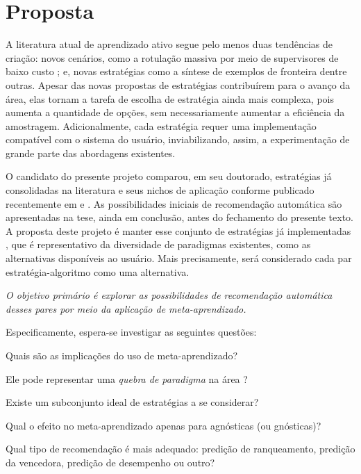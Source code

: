 \section{Proposta}\label{pr}
A literatura atual de aprendizado ativo segue pelo menos duas tendências de criação:
novos cenários, como a rotulação massiva por meio de supervisores de baixo custo \citep{journals/ijcv/VijayanarasimhanG14};
e, novas estratégias como a síntese de exemplos de fronteira \citep{journals/ijon/WangHYL15}
dentre outras.
Apesar das novas propostas de estratégias contribuírem para o avanço da área,
elas tornam a tarefa de escolha de estratégia ainda mais complexa,
pois aumenta a quantidade de opções, sem necessariamente aumentar a eficiência
da amostragem.
Adicionalmente, cada estratégia requer uma implementação compatível com o sistema do usuário,
inviabilizando, assim, a experimentação de grande parte das abordagens existentes.

O candidato do presente projeto comparou, em seu doutorado, estratégias já
consolidadas na literatura e seus nichos de aplicação conforme publicado recentemente
em \cite{santos2014viabilidade} e \cite{conf/hais/SantosC14}.
As possibilidades iniciais de recomendação automática são apresentadas na tese,
ainda em conclusão, antes do fechamento do presente texto.
A proposta deste projeto é manter esse conjunto de estratégias já implementadas
\citep{doi/al}, que é representativo da diversidade de paradigmas existentes, 
como as alternativas disponíveis ao usuário.
Mais precisamente, será considerado cada par estratégia-algoritmo como
uma alternativa.

\textit{O objetivo primário é explorar as possibilidades de recomendação automática
desses pares por meio da aplicação de meta-aprendizado.}

Especificamente, espera-se investigar as seguintes questões:
\begin{compactenum}
\item{Quais são as implicações do uso de meta-aprendizado?}
\item{Ele pode representar uma \textit{quebra de paradigma} na área \citep{kuhn2012structure}?}
\item{Existe um subconjunto ideal de estratégias a se considerar?}
\item{Qual o efeito no meta-aprendizado apenas para agnósticas (ou gnósticas)?}
\item{Qual tipo de recomendação é mais adequado: 
predição de ranqueamento, predição da vencedora, predição de desempenho ou outro?}
\end{compactenum}

